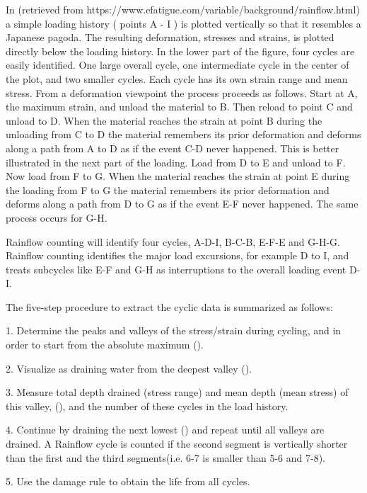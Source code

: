 In (retrieved from https://www.efatigue.com/variable/background/rainflow.html) a simple loading history ( points A - I ) is plotted vertically so that it resembles a Japanese pagoda. The resulting deformation, stresses and strains, is plotted directly below the loading history. In the lower part of the figure, four cycles are easily identified. One large overall cycle, one intermediate cycle in the center of the plot, and two smaller cycles. Each cycle has its own strain range and mean stress. From a deformation viewpoint the process proceeds as follows. Start at A, the maximum strain, and unload the material to B. Then reload to point C and unload to D. When the material reaches the strain at point B during the unloading from C to D the material remembers its prior deformation and deforms along a path from A to D as if the event C-D never happened. This is better illustrated in the next part of the loading. Load from D to E and unload to F. Now load from F to G. When the material reaches the strain at point E during the loading from F to G the material remembers its prior deformation and deforms along a path from D to G as if the event E-F never happened. The same process occurs for G-H.

Rainflow counting will identify four cycles, A-D-I, B-C-B, E-F-E and G-H-G. Rainflow counting identifies the major load excursions, for example D to I, and treats subcycles like E-F and G-H as interruptions to the overall loading event D-I.

\vspace{6pt}
The five-step procedure to extract the cyclic data is summarized as follows:

1.  Determine the peaks and valleys of the stress/strain during cycling, and in order to start from the absolute maximum ().

2.  Visualize as draining water from the deepest valley ().

3.  Measure total depth drained (stress range) and mean depth (mean stress) of this valley, (), and the number of these cycles in the load history. 

4.  Continue by draining the next lowest () and repeat until all valleys are drained. A  Rainflow  cycle is counted if the second segment is vertically shorter than the first and the third segments(i.e. 6-7 is smaller than 5-6 and 7-8).

5.  Use the damage rule to obtain the life from all cycles.

